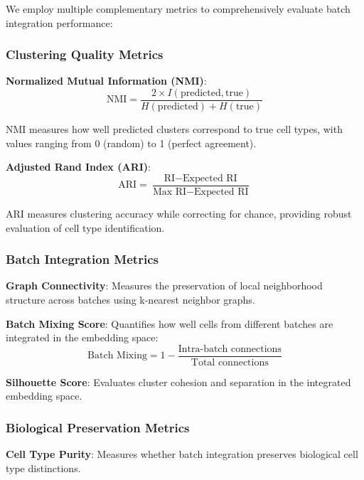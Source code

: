 We employ multiple complementary metrics to comprehensively evaluate batch integration performance:

\subsubsection{Clustering Quality Metrics}

\textbf{Normalized Mutual Information (NMI)}:
\begin{equation}
\text{NMI} = \frac{2 \times I(\text{predicted}, \text{true})}{H(\text{predicted}) + H(\text{true})}
\end{equation}

NMI measures how well predicted clusters correspond to true cell types, with values ranging from 0 (random) to 1 (perfect agreement).

\textbf{Adjusted Rand Index (ARI)}:
\begin{equation}
\text{ARI} = \frac{\text{RI} - \text{Expected RI}}{\text{Max RI} - \text{Expected RI}}
\end{equation}

ARI measures clustering accuracy while correcting for chance, providing robust evaluation of cell type identification.

\subsubsection{Batch Integration Metrics}

\textbf{Graph Connectivity}: Measures the preservation of local neighborhood structure across batches using k-nearest neighbor graphs.

\textbf{Batch Mixing Score}: Quantifies how well cells from different batches are integrated in the embedding space:
\begin{equation}
\text{Batch Mixing} = 1 - \frac{\text{Intra-batch connections}}{\text{Total connections}}
\end{equation}

\textbf{Silhouette Score}: Evaluates cluster cohesion and separation in the integrated embedding space.

\subsubsection{Biological Preservation Metrics}

\textbf{Cell Type Purity}: Measures whether batch integration preserves biological cell type distinctions.

